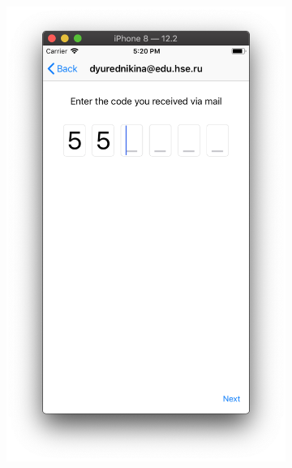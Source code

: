 \documentclass[a4paper,12pt]{article}
\begin{document}
\begin{figure}[h!]
\begin{subfigure}[b]{0.3\linewidth}
			\includegraphics[width=\linewidth]{../includes/pmi/code1.png}
		\end{subfigure}
		\begin{subfigure}[b]{0.3\linewidth}

\end{subfigure}
\end{figure}
\end{document}
